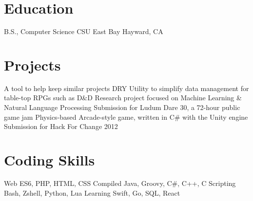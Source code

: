 \documentclass[11pt,a4paper,sans]{moderncv}        %
\begin{document}
\section{Education}         %
         {B.S., Computer Science}
        {CSU East Bay}      {Hayward, CA}
        {}                  {}  %

\section{Projects}          %
                     {A tool to help keep similar projects DRY}
             {Utility to simplify data management for table-top RPGs such as D\&D}
                      {Research project focused on Machine Learning \& Natural Language Processing}
                  {Submission for Ludum Dare 30, a 72-hour public game jam}
                         {Physics-based Arcade-style game, written in C\# with the Unity engine}
	        {Submission for Hack For Change 2012}

\section{Coding Skills}     %
\cvdoubleitem
{Web}               {ES6, PHP, HTML, CSS}
{Compiled}          {Java, Groovy, C\#, C++, C}
\cvdoubleitem
{Scripting}         {Bash, Zshell, Python, Lua}
{Learning}          {Swift, Go, SQL, React}
\end{document}
